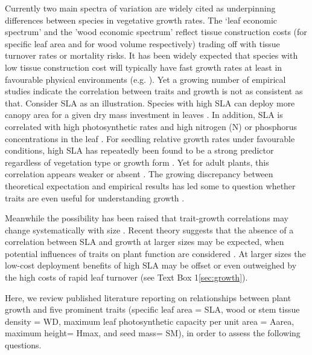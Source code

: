 \documentclass[a4paper]{article}\usepackage[]{graphicx}\usepackage[]{color}
\begin{document}
Currently two main spectra of variation are widely cited as underpinning differences between species in vegetative growth rates. The `leaf economic spectrum' \citep{Wright:2004jb} and the 'wood economic spectrum' \citep{Chave:2009iy} reflect tissue construction costs (for specific leaf area and for wood volume respectively) trading off with tissue turnover rates or mortality risks. It has been widely expected that species with low tissue construction cost will typically have fast growth rates at least in favourable physical environments (e.g. \citealt{MullerLandau:2004dc,Wright:2004jb,Poorter:2008iu,Chave:2009iy,Larjavaara:2010bn,Iida:2012jb,Paine:2015df}). Yet a growing number of empirical studies indicate the correlation between traits and growth is not as consistent as that. Consider SLA as an illustration. Species with high SLA can deploy more canopy area for a given dry mass investment in leaves \citep{Poorter:1999wd, Reich:1992wm}. In addition, SLA is correlated with high photosynthetic rates and high nitrogen (N) or phosphorus concentrations in the leaf \citep{Wright:2004jb}. For seedling relative growth rates under favourable conditions, high SLA has repeatedly been found to be a strong predictor regardless of vegetation type or growth form \citep{Lambers:1992bj,Reich:1992wm,Grime:1997wm,Poorter:1999wd,Wright:1999ds}. Yet for adult plants, this correlation appears weaker or absent \citep{coomes_comparison_1998,Poorter:2008iu,Aiba:2009ft,Easdale:2009gv,Wright:2010tp}. The growing discrepancy between theoretical expectation and empirical results has led some to question whether traits are even useful for understanding growth \citep{Wright:2010tp, Paine:2015df}.

Meanwhile the possibility has been raised that trait-growth correlations may change systematically with size \citep{Falster:2011ii, Ruger:2012jv, Iida:2014ep, Iida:2014hq}. Recent theory suggests that the absence of a correlation between SLA and growth at larger sizes may be expected, when  potential influences of traits on plant function are considered \citep{Falster:2011ii, falster:2013}. At larger sizes the low-cost deployment benefits of high SLA may be offset or even outweighed by the high costs of rapid leaf turnover (see Text Box 1\ref{sec:growth}). 

Here, we review published literature reporting on relationships between
plant growth and five prominent traits (specific leaf area = SLA, wood or stem tissue density = WD, maximum leaf photosynthetic capacity per unit area = Aarea,  maximum height= Hmax, and seed mass= SM), in order to assess the following questions.
\end{document}
